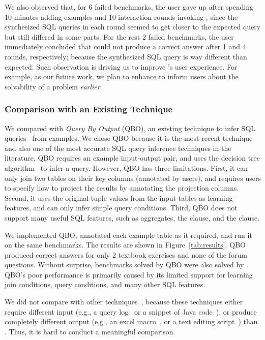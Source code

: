 We also observed that,
for 6 failed benchmarks, the user
gave up after spending 10 minutes adding
examples and
10 interaction rounds invoking \ourtool, since the synthesized
SQL queries in each round seemed to get closer to the expected
query but still differed in some parts.
For the rest 2 failed benchmarks, the user immediately
concluded that \ourtool could not produce a correct
answer after 1 and 4 rounds, respectively;
because the synthesized SQL
query is way different than expected.
Such observation is driving us to improve \ourtool's
user experience. For example, as our future work,
we plan to enhance \ourtool to inform users
about the solvability of a problem
\textit{earlier}.



\subsubsection{Comparison with an Existing Technique}
\label{sec:comparison}
We compared \ourtool with \textit{Query By Output} (QBO), an
existing technique to infer SQL queries~\cite{Tran:2009} from examples.
We chose QBO because it is the most recent technique and also one
of the most accurate SQL query inference techniques in
the literature. QBO requires an example input-output pair, and
uses the decision tree algorithm~\cite{Quinlan:1986} to infer a query.
However, QBO has three limitations. First, 
it can only join two tables on their key columns (annotated by users), and requires
users to specify how to project the results
by annotating the projection columns.
Second, it uses the original tuple values
from the input tables as learning features, and can only
infer simple query conditions. Third, QBO does not support
many useful SQL features, such as aggregates, the 
clause, and the  clause.

We implemented QBO, annotated
each example table as it required, and run it
on the same benchmarks. The results are shown in Figure~\ref{tab:results}.
QBO produced correct answers
for only 2 textbook exercises and none of the forum questions.
Without surprise, 
benchmarks solved by QBO were also solved by \ourtool.
QBO's poor performance is primarily caused by its
limited support for learning join conditions,
query conditions, and many other SQL features.

We did not compare \ourtool with other techniques~\cite{Howe:2011,
abs-1208-2013, Harris:2011, Kandel:2011}, because
these techniques either require different input
(e.g., a query log~\cite{Khoussainova:2010, Howe:2011}
or a snippet of Java code~\cite{abs-1208-2013}), 
or produce completely different
output (e.g., an excel macro~\cite{Harris:2011}, or a
text editing script~\cite{Kandel:2011}) than \ourtool.
Thus, it is hard to conduct a meaningful comparison.

